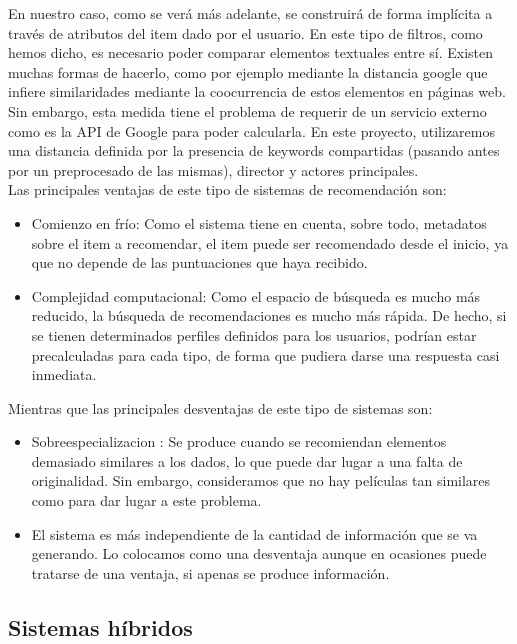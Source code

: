 En nuestro caso, como se verá más adelante, se construirá de forma implícita a través de atributos del item dado por el usuario. En este tipo de filtros, como hemos dicho, es necesario poder comparar elementos textuales entre sí. Existen muchas formas de hacerlo, como por ejemplo mediante la distancia google \cite{cilibrasi} que infiere similaridades mediante la coocurrencia de estos elementos en páginas web. Sin embargo, esta medida tiene el problema de requerir de un servicio externo como es la API de Google para poder calcularla. En este proyecto, utilizaremos una distancia definida por la presencia de keywords compartidas (pasando antes por un preprocesado de las mismas), director y actores principales.\\

Las principales ventajas de este tipo de sistemas de recomendación son:
\begin{itemize}
    \item Comienzo en frío: Como el sistema tiene en cuenta, sobre todo, metadatos sobre el item a recomendar, el item puede ser recomendado desde el inicio, ya que no depende de las puntuaciones que haya recibido.
    \item Complejidad computacional: Como el espacio de búsqueda es mucho más reducido, la búsqueda de recomendaciones es mucho más rápida. De hecho, si se tienen determinados perfiles definidos para los usuarios, podrían estar precalculadas para cada tipo, de forma que pudiera darse una respuesta casi inmediata.
\end{itemize}

Mientras que las principales desventajas de este tipo de sistemas son:
\begin{itemize}
    \item Sobreespecializacion \cite{zhang}: Se produce cuando se recomiendan elementos demasiado similares a los dados, lo que puede dar lugar a una falta de originalidad. Sin embargo, consideramos que no hay películas tan similares como para dar lugar a este problema.
    \item El sistema es más independiente de la cantidad de información que se va generando. Lo colocamos como una desventaja aunque en ocasiones puede tratarse de una ventaja, si apenas se produce información.
\end{itemize}



\subsection{Sistemas híbridos}\label{sec:hibridos}

